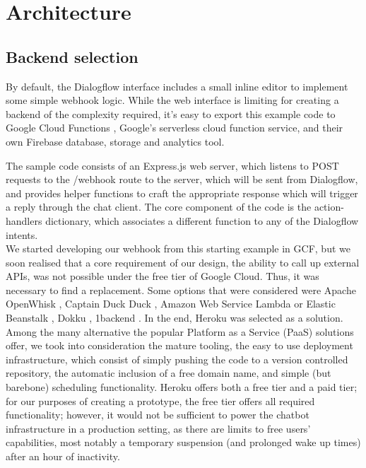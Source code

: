 \section*{Architecture}
\subsection*{Backend selection}
By default, the Dialogflow interface includes a small inline editor to implement some simple webhook logic. While the web interface is limiting for creating a backend of the complexity required, it's easy to export this example code to Google Cloud Functions \cite{gcfwebsite}, Google's serverless cloud function service, and their own Firebase database, storage and analytics tool. 

The sample code consists of an Express.js \cite{expresswebsite} web server, which listens to POST requests to the /webhook route to the server, which will be sent from Dialogflow, and provides helper functions to craft the appropriate response which will trigger a reply through the chat client. The core component of the code is the action-handlers dictionary, which associates a different function to any of the Dialogflow intents. \\

We started developing our webhook from this starting example in GCF, but we soon realised that a core requirement of our design, the ability to call up external APIs, was not possible under the free tier of Google Cloud. Thus, it was necessary to find a replacement. Some options that were considered were Apache OpenWhisk \cite{apacheopenwhisk}, Captain Duck Duck \cite{captainduckduck}, Amazon Web Service Lambda or Elastic Beanstalk \cite{awsproductwebsite}, Dokku \cite{dokku}, 1backend \cite{1backend}. In the end, Heroku was selected as a solution. Among the many alternative the popular Platform as a Service (PaaS) solutions offer, we took into consideration the mature tooling, the easy to use deployment infrastructure, which consist of simply pushing the code to a version controlled repository, the automatic inclusion of a free domain name, and simple (but barebone) scheduling functionality. Heroku offers both a free tier and a paid tier; for our purposes of creating a prototype, the free tier offers all required functionality; however, it would not be sufficient to power the chatbot infrastructure in a production setting, as there are limits to free users' capabilities, most notably a temporary suspension (and prolonged wake up times) after an hour of inactivity.
